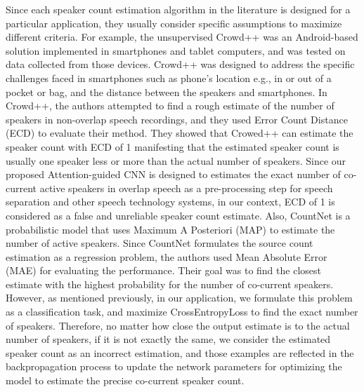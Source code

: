 \documentclass[a4paper]{article}
\begin{document}
Since each speaker count estimation algorithm in the literature is designed for a particular application, they usually consider specific assumptions to maximize different criteria. For example, the unsupervised Crowd++ \cite{xu2013crowd++} was an Android-based solution implemented in smartphones and tablet computers, and was tested on data collected from those devices. Crowd++ was designed to address the specific challenges faced in smartphones such as phone's location e.g., in or out of a pocket or bag, and the distance between the speakers and smartphones. In Crowd++, the authors attempted to find a rough estimate of the number of speakers in non-overlap speech recordings, and they used Error Count Distance (ECD) to evaluate their method. They showed that Crowed++ can estimate the speaker count with ECD of 1 manifesting that the estimated speaker count is usually one speaker less or more than the actual number of speakers. Since our proposed Attention-guided CNN is designed to estimates the exact number of co-current active speakers in overlap speech as a pre-processing step for speech separation and other speech technology systems, in our context, ECD of 1 is considered as a false and unreliable speaker count estimate. Also, CountNet \cite{stoter2018countnet} is a probabilistic model that uses Maximum A Posteriori (MAP) to estimate the number of active speakers. Since CountNet formulates the source count estimation as a regression problem, the authors used Mean Absolute Error (MAE) for evaluating the performance. Their goal was to find the closest estimate with the highest probability for the number of co-current speakers. However, as mentioned previously, in our application, we formulate this problem as a classification task, and maximize CrossEntropyLoss to find the exact number of speakers. Therefore, no matter how close the output estimate is to the actual number of speakers, if it is not exactly the same, we consider the estimated speaker count as an incorrect estimation, and those examples are reflected in the backpropagation process to update the network parameters for optimizing the model to estimate the precise co-current speaker count. 
\end{document}
